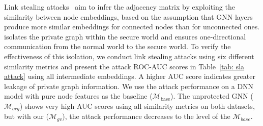 Link stealing attacks~\cite{he2021stealing, ding2023vertexserum} aim to infer the adjacency matrix by exploiting the similarity between node embeddings, based on the assumption that GNN layers produce more similar embeddings for connected nodes than for unconnected ones. \mymethod isolates the private graph within the secure world and ensures one-directional communication from the normal world to the secure world. To verify the effectiveness of this isolation, we conduct link stealing attacks using six different similarity metrics and present the attack ROC-AUC scores in Table~\ref{tab: sla attack} using all intermediate embeddings. A higher AUC score indicates greater leakage of private graph information. We use the attack performance on a DNN model with pure node features as the baseline ($\mathcal{M}_{\text{base}}$). The unprotected GNN ($\mathcal{M}_{org}$) shows very high AUC scores using all similarity metrics on both datasets, but with our \mymethod ($\mathcal{M}_{gv}$), the attack performance decreases to the level of the $\mathcal{M}_{base}$.
 


